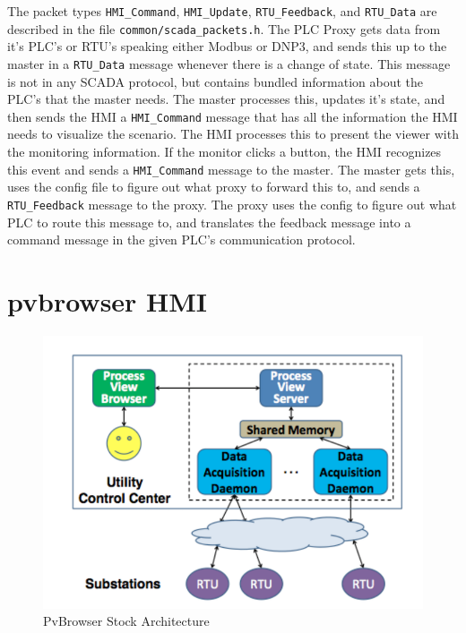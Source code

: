 \documentclass[11pt,a4paper,oldfontcommands]{memoir}
\def\code#1{\texttt{#1}}
\begin{document}
\indent
The packet types \code{HMI\_Command}, \code{HMI\_Update}, \code{RTU\_Feedback},
and \code{RTU\_Data} are described in the file \code{common/scada\_packets.h}.
The PLC Proxy gets data from it's PLC's or RTU's speaking either Modbus or DNP3,
and sends this up to the
master in a \code{RTU\_Data} message whenever there is a change of state.
This message is not in any SCADA
protocol, but contains bundled information about the PLC's that the master
needs. The master processes this, updates it's state, and then sends the
HMI a \code{HMI\_Command} message that has all the information the HMI needs
to visualize the scenario. The HMI processes this to present the viewer with
the monitoring information. If the monitor clicks a button, the HMI 
recognizes this event and sends a \code{HMI\_Command} message to the master.
The master gets this, uses the config file to figure out what proxy to forward
this to, and sends a \code{RTU\_Feedback} message to the proxy. The proxy uses
the config to figure out what PLC to route this message to, and translates
the feedback message into a command message in the given PLC's communication
protocol. \\







\section{pvbrowser HMI}

\begin{figure}[ht]
  \begin{center}
  \includegraphics{pvb_architecture}
  \caption{PvBrowser Stock Architecture}
  \label{fig:3}
  \end{center}
\end{figure}
\end{document}
